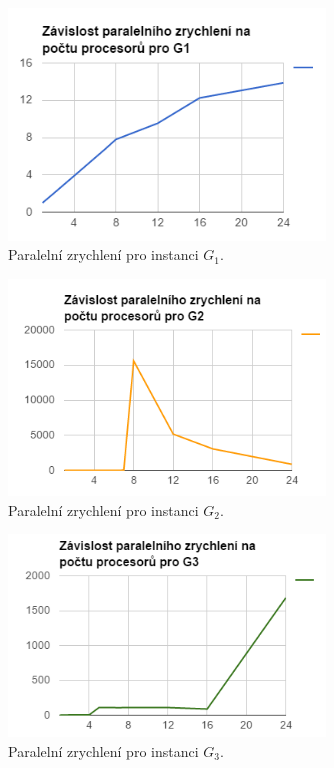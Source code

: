 \documentclass[12pt]{article}
\theoremstyle{definition}
\begin{document}
\begin{figure}[ht]
	\centering
	\includegraphics[width=0.75\textwidth]{obr/acc1.png}
	\caption{Paralelní zrychlení pro instanci $G_1$.}
	\label{imgAcc1}
\end{figure}
\begin{figure}[ht]
	\centering
	\includegraphics[width=0.75\textwidth]{obr/acc2.png}
	\caption{Paralelní zrychlení pro instanci $G_2$.}
	\label{imgAcc2}
\end{figure}
\begin{figure}[ht]
	\centering
	\includegraphics[width=0.75\textwidth]{obr/acc3.png}
	\caption{Paralelní zrychlení pro instanci $G_3$.}
	\label{imgAcc3}
\end{figure}
\end{document}
